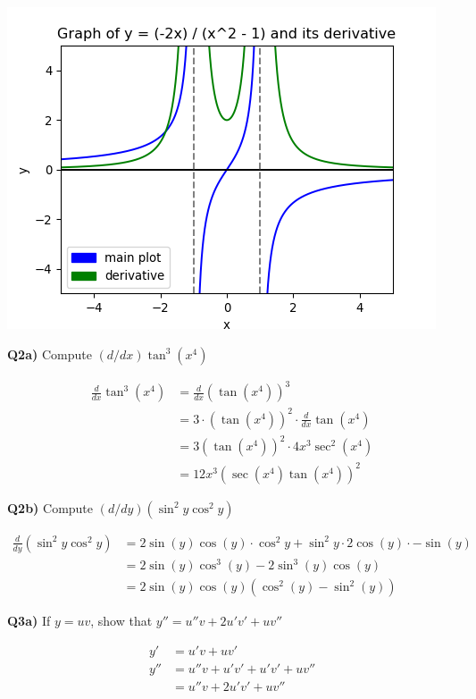 \documentclass[9pt]{article}
\begin{document}
\begin{center}
  \includegraphics[scale=0.8]{q1_odd.png}
\end{center}


\begin{tcolorbox}
  \textbf{Q2a)} Compute $(d/dx) \tan^3(x^4)$
\end{tcolorbox}
\begin{align*}
  \frac{d}{dx} \tan^3 (x^4) &= \frac{d}{dx} (\tan(x^4))^3\\
                           &= 3 \cdot (\tan(x^4))^2 \cdot \frac{d}{dx} \tan(x^4)\\
                           &= 3(\tan(x^4))^2 \cdot 4x^3 \sec^2(x^4)\\
                           &= 12x^3 (\sec(x^4)\tan(x^4))^2
\end{align*}


\begin{tcolorbox}
  \textbf{Q2b)} Compute $(d/dy)(\sin^2y\cos^2y)$
\end{tcolorbox}
\begin{align*}
  \frac{d}{dy} (\sin^2y\cos^2y) &= 2\sin(y)\cos(y) \cdot \cos^2y + \sin^2y \cdot 2\cos(y) \cdot -\sin(y)\\
                                &= 2\sin(y)\cos^3(y) - 2\sin^3(y)\cos(y)\\
                                &= 2\sin(y)\cos(y)(\cos^2(y) - \sin^2(y))
\end{align*}


\begin{tcolorbox}
  \textbf{Q3a)} If $y = uv$, show that $y'' = u''v + 2u'v' + uv''$
\end{tcolorbox}
\begin{align*}
  y' &= u'v + uv'\\
  y'' &= u''v + u'v' + u'v' + uv''\\
      &= u''v + 2u'v' + uv''
\end{align*}
\end{document}
